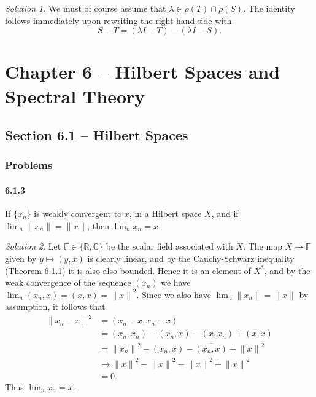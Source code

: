\documentclass{report}
\newcommand{\bb}[1]{\mathbb{#1}}
\newcommand{\norm}[1]{{\lVert #1 \rVert}}
\theoremstyle{remark}
\newtheorem*{solution}{Solution}
\begin{document}
\begin{solution}
  We must of course assume that $\lambda \in \rho(T) \cap \rho(S)$. The identity follows immediately upon rewriting the right-hand side with
  \begin{equation*}
    S - T = (\lambda I - T) - (\lambda I - S).
  \end{equation*}
\end{solution}

\chapter*{Chapter 6 -- Hilbert Spaces and Spectral Theory}

\section*{Section 6.1 -- Hilbert Spaces}

\subsection*{Problems}

\subsubsection*{6.1.3}
If $\{x_n\}$ is weakly convergent to $x$, in a Hilbert space $X$, and if $\lim_n \norm{x_n} = \norm x$, then $\lim_n x_n = x$.

\begin{solution}
  Let $\bb F \in \{\bb R, \bb C\}$ be the scalar field associated with $X$. The map $X \to \bb F$ given by $y \mapsto (y,x)$ is clearly linear, and by the Cauchy-Schwarz inequality (Theorem 6.1.1) it is also also bounded. Hence it is an element of $X^*$, and by the weak convergence of the sequence $(x_n)$ we have $\lim_n (x_n,x) = (x,x) = \norm x^2$. Since we also have $\lim_n \norm{x_n} = \norm x$ by assumption, it follows that
  \begin{equation*}
    \begin{split}
      \norm{x_n - x}^2 &= (x_n - x, x_n - x) \\
      &= (x_n, x_n) - (x_n, x) - (x, x_n) + (x,x) \\
      &= \norm{x_n}^2 - (x_n, x) - \overline{(x_n, x)} + \norm x^2 \\
      &\to \norm x^2 - \norm x^2 - \norm x^2 + \norm x^2 \\
      &= 0.
    \end{split}
  \end{equation*}
  Thus $\lim_n x_n = x$.
\end{solution}
\end{document}
